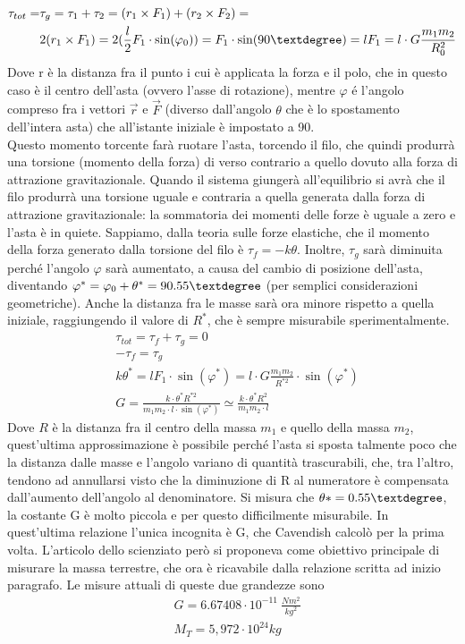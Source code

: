 \begin{align*}
	\tau_{tot} =& \tau_g = \tau_1 + \tau_2 = (r_1 \times F_1) +  (r_2 \times F_2) =\\
	& 2 (r_1 \times F_1)= 2(\frac{l}{2} F_1\cdot \sin(\varphi_0)) =   F_1\cdot \sin(90 \textdegree) = l F_1 =l \cdot G \frac{m_1 m_2}{R_0^{2}}
\end{align*} 
Dove r è la distanza fra il punto i cui è applicata la forza e il polo, che in questo caso è il centro dell'asta (ovvero l'asse di rotazione), mentre $\varphi$ é l'angolo compreso fra i vettori $\vec{r}$ e $\vec{F}$ (diverso dall'angolo $\theta$ che è lo spostamento dell'intera asta) che all'istante iniziale è impostato a 90\textdegree.\\
Questo momento torcente farà ruotare l'asta, torcendo il filo, che quindi produrrà una torsione (momento della forza) di verso contrario a quello dovuto alla forza di attrazione gravitazionale. Quando il sistema giungerà all'equilibrio si avrà che il filo produrrà una torsione uguale e contraria a quella generata dalla forza di attrazione gravitazionale: la sommatoria dei momenti delle forze è uguale a zero e l'asta è in quiete. Sappiamo, dalla teoria sulle forze elastiche, che il momento della forza generato dalla torsione del filo è $\tau_f = -k \theta$. Inoltre, $\tau_g$ sarà diminuita perché l'angolo $\varphi$ sarà aumentato, a causa del cambio di posizione dell'asta, diventando $\varphi^*=\varphi_0+\theta^*=90.55\textdegree$ (per semplici considerazioni geometriche). Anche la distanza fra le masse sarà ora minore rispetto a quella iniziale, raggiungendo il valore di $R^*$, che è sempre misurabile sperimentalmente.
\begin{align*}
	&\tau_ {tot} = \tau_f+\tau_g = 0 \\
	&-\tau_f = \tau_g \\
	& k \theta^* = l F_1\cdot \sin(\varphi^*) = l \cdot G \frac{m_1 m_2}{R^{*2}}\cdot \sin(\varphi^*)\\
	&G = \frac{k\cdot \theta^* R^{*2}}{m_1 m_2\cdot l\cdot \sin(\varphi^*)} \simeq \frac{k\cdot \theta^* R^{2}}{m_1 m_2\cdot l}
\end{align*}
Dove $R$ è la distanza fra il centro della massa $m_1$ e quello della massa $m_2$, quest'ultima approssimazione è possibile perché l'asta si sposta talmente poco che la distanza dalle masse e l'angolo variano di quantità trascurabili, che, tra l'altro, tendono ad annullarsi visto che la diminuzione di R al numeratore è compensata dall'aumento dell'angolo al denominatore. Si misura che $\theta* = 0.55\textdegree$, la costante G è molto piccola e per questo difficilmente misurabile. In quest'ultima relazione l'unica incognita è G, che Cavendish calcolò per la prima volta. L'articolo dello scienziato però si proponeva come obiettivo principale di misurare la massa terrestre, che ora è ricavabile dalla relazione scritta ad inizio paragrafo. Le misure attuali di queste due grandezze sono
\begin{align*}
& G = 6.67408\cdot 10^{-11}\ \frac{N m^2}{kg^2}\\
&M_T = 5,972 \cdot 10^{24} kg
\end{align*}
